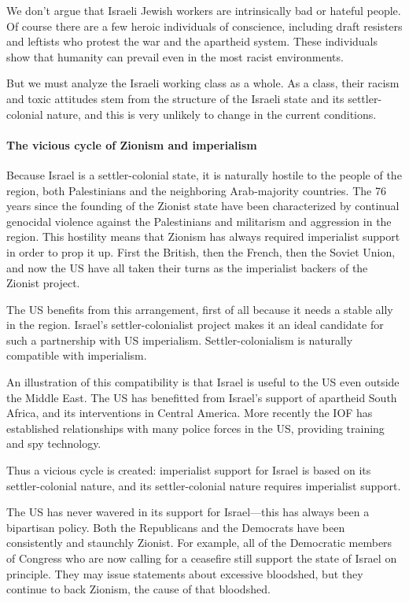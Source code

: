 We don't argue that Israeli Jewish workers are intrinsically bad or hateful people. Of course there are a few heroic individuals of conscience, including draft resisters and leftists who protest the war and the apartheid system. These individuals show that humanity can prevail even in the most racist environments.

But we must analyze the Israeli working class as a whole. As a class, their racism and toxic attitudes stem from the structure of the Israeli state and its settler-colonial nature, and this is very unlikely to change in the current conditions.

\paragraph{The vicious cycle of Zionism and imperialism}

Because Israel is a settler-colonial state, it is naturally hostile to the people of the region, both Palestinians and the neighboring Arab-majority countries. The 76 years since the founding of the Zionist state have been characterized by continual genocidal violence against the Palestinians and militarism and aggression in the region. This hostility means that Zionism has always required imperialist support in order to prop it up. First the British, then the French, then the Soviet Union, and now the US have all taken their turns as the imperialist backers of the Zionist project.

The US benefits from this arrangement, first of all because it needs a stable ally in the region. Israel's settler-colonialist project makes it an ideal candidate for such a partnership with US imperialism. Settler-colonialism is naturally compatible with imperialism.

An illustration of this compatibility is that Israel is useful to the US even outside the Middle East. The US has benefitted from Israel's support of apartheid South Africa, and its interventions in Central America. More recently the IOF has established relationships with many police forces in the US, providing training and spy technology.

Thus a vicious cycle is created: imperialist support for Israel is based on its settler-colonial nature, and its settler-colonial nature requires imperialist support.

The US has never wavered in its support for Israel---this has always been a bipartisan policy. Both the Republicans and the Democrats have been consistently and staunchly Zionist. For example, all of the Democratic members of Congress who are now calling for a ceasefire still support the state of Israel on principle. They may issue statements about excessive bloodshed, but they continue to back Zionism, the cause of that bloodshed.

